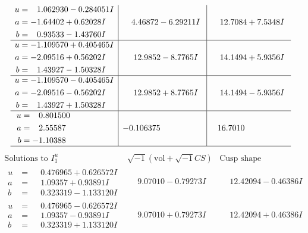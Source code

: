 \documentclass[1p]{elsarticle_modified}
\theoremstyle{definition}
\newcommand{\I}{\sqrt{-1}}
\begin{document}
$$\begin{array}{c|c|c}
\begin{aligned}
u &= \phantom{-}1.062930 - 0.284051 I \\
a &= -1.64402 + 0.62028 I \\
b &= \phantom{-}0.93533 - 1.43760 I\end{aligned}
 & \phantom{-}4.46872 - 6.29211 I & \phantom{-}12.7084 + 7.5348 I \\ \hline\begin{aligned}
u &= -1.109570 + 0.405465 I \\
a &= -2.09516 + 0.56202 I \\
b &= \phantom{-}1.43927 - 1.50328 I\end{aligned}
 & \phantom{-}12.9852 - 8.7765 I & \phantom{-}14.1494 + 5.9356 I \\ \hline\begin{aligned}
u &= -1.109570 - 0.405465 I \\
a &= -2.09516 - 0.56202 I \\
b &= \phantom{-}1.43927 + 1.50328 I\end{aligned}
 & \phantom{-}12.9852 + 8.7765 I & \phantom{-}14.1494 - 5.9356 I \\ \hline\begin{aligned}
u &= \phantom{-}0.801500\phantom{ +0.000000I} \\
a &= \phantom{-}2.55587\phantom{ +0.000000I} \\
b &= -1.10388\phantom{ +0.000000I}\end{aligned}
 & -0.106375\phantom{ +0.000000I} & \phantom{-}16.7010\phantom{ +0.000000I}\\
 \hline 
 \end{array}$$\newpage$$\begin{array}{c|c|c}  
\text{Solutions to }I^u_{1}& \I (\text{vol} + \sqrt{-1}CS) & \text{Cusp shape}\\
 \hline 
\begin{aligned}
u &= \phantom{-}0.476965 + 0.626572 I \\
a &= \phantom{-}1.09357 + 0.93891 I \\
b &= \phantom{-}0.323319 - 1.133120 I\end{aligned}
 & \phantom{-}9.07010 - 0.79273 I & \phantom{-}12.42094 - 0.46386 I \\ \hline\begin{aligned}
u &= \phantom{-}0.476965 - 0.626572 I \\
a &= \phantom{-}1.09357 - 0.93891 I \\
b &= \phantom{-}0.323319 + 1.133120 I\end{aligned}
 & \phantom{-}9.07010 + 0.79273 I & \phantom{-}12.42094 + 0.46386 I \\ \hline\begin{aligned}

\end{aligned}
\end{array}$$
\end{document}
